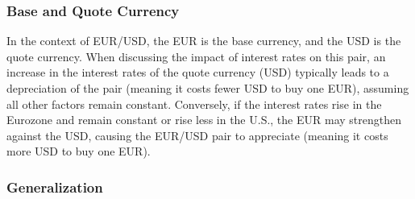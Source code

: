 \documentclass{report}
\begin{document}
     \subsubsection{Base and Quote Currency}
     In the context of EUR/USD, the EUR is the base currency, and the USD is the quote currency. When discussing the impact of interest rates on this pair, an increase in the interest rates of the quote currency (USD) typically leads to a depreciation of the pair (meaning it costs fewer USD to buy one EUR), assuming all other factors remain constant. Conversely, if the interest rates rise in the Eurozone and remain constant or rise less in the U.S., the EUR may strengthen against the USD, causing the EUR/USD pair to appreciate (meaning it costs more USD to buy one EUR).

     \bigbreak \noindent 
     \subsubsection{Generalization}
     \bigbreak \noindent 




     
\end{document}
